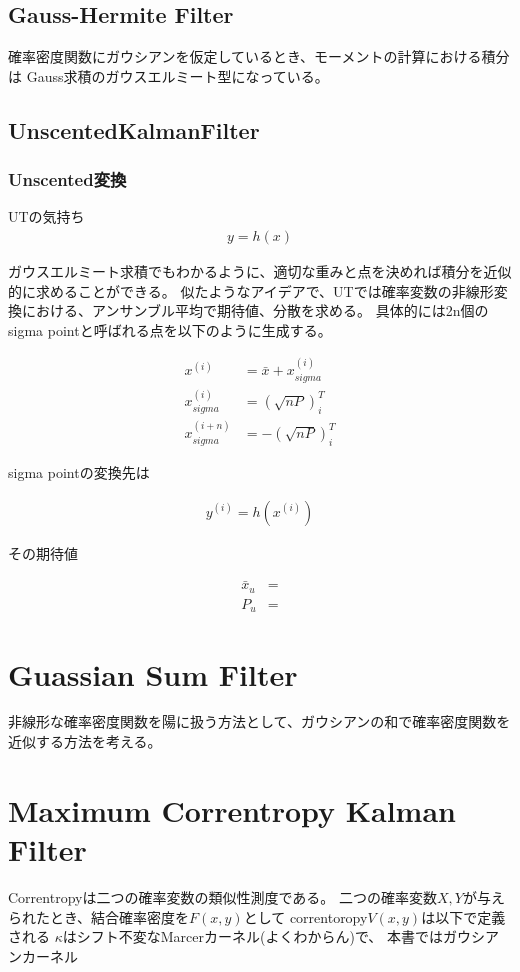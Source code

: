 \subsection{Gauss-Hermite Filter}
確率密度関数にガウシアンを仮定しているとき、モーメントの計算における積分は
Gauss求積のガウスエルミート型になっている。



\subsection{UnscentedKalmanFilter}
\subsubsection{Unscented変換}
UTの気持ち
\begin{align}
y=h(x)
\end{align}

ガウスエルミート求積でもわかるように、適切な重みと点を決めれば積分を近似的に求めることができる。
似たようなアイデアで、UTでは確率変数の非線形変換における、アンサンブル平均で期待値、分散を求める。
具体的には2n個のsigma pointと呼ばれる点を以下のように生成する。

\begin{align}
x^{(i)}&=\bar{x}+x_{sigma}^{(i)}  				\\
x_{sigma}^{(i)} &= (\sqrt{nP})_i^T 					\\
x_{sigma}^{(i+n)} &= -(\sqrt{nP})_i^T
\end{align}

sigma pointの変換先は

\begin{align}
y^{(i)} = h(x^{(i)})
\end{align}

その期待値

\begin{align}
\bar{x}_u&= 							\\
P_u&=
\end{align}


\section{Guassian Sum Filter}
非線形な確率密度関数を陽に扱う方法として、ガウシアンの和で確率密度関数を近似する方法を考える。

\section{Maximum Correntropy Kalman Filter}
Correntropyは二つの確率変数の類似性測度である。
二つの確率変数$X,Y$が与えられたとき、結合確率密度を$F(x,y)$として
correntoropy$V(x,y)$は以下で定義される
$\kappa$はシフト不変なMarcerカーネル(よくわからん)で、
本書ではガウシアンカーネル




